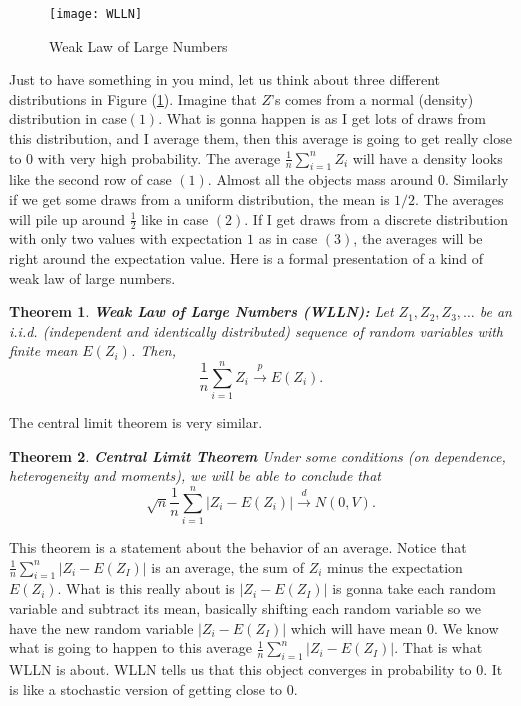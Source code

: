 \documentclass[11pt,a4paper]{amsart}
\theoremstyle{plain}
\newtheorem{theorem}{Theorem}
\theoremstyle{definition}
\begin{document}
	\begin{figure}[hbt]
	{\centering \texttt{[image: WLLN]}}
	\caption{Weak Law of Large Numbers}\label{F:WLLN}
	\end{figure}

	Just to have something in you mind, let us think about three different distributions in Figure (\ref{F:WLLN}). Imagine that $Z$'s comes from a normal (density) distribution in case$(1)$. What is gonna happen is as I get lots of draws from this distribution, and I average them, then this average is going to get really close to $0$ with very high probability. The average $\frac{1}{n} \sum_{i=1}^{n} Z_{i}$ will have a density looks like the second row of case $(1)$. Almost all the objects mass around $0$. Similarly if we get some draws from a uniform distribution, the mean is $1/2$. The averages will pile up around $\frac{1}{2}$ like in case $(2)$. If I get draws from a discrete distribution with only two values with expectation $1$ as in case $(3)$, the averages will be right around the expectation value. Here is a formal presentation of a kind of weak law of large numbers. 
	\begin{theorem}
		\textbf{Weak Law of Large Numbers (WLLN):} Let $Z_{1}, Z_{2}, Z_{3}, \ldots$ be an i.i.d. (independent and identically distributed) sequence of random variables with finite mean $E\left(Z_{i}\right)$. Then,
	\[		\frac{1}{n} \sum_{i=1}^{n} Z_{i} \stackrel{p}{\longrightarrow} E\left(Z_{i}\right).\]
	\end{theorem}
	The central limit theorem is very similar.
	\begin{theorem}
		\textbf{Central Limit Theorem} Under some conditions (on dependence, heterogeneity and moments), we will be able to conclude that
		\[	\sqrt{n} \frac{1}{n} \sum_{i=1}^{n} |Z_{i} - E(Z_{i })| \stackrel{d}{\longrightarrow} N(0,V).	\]
	\end{theorem}
	This theorem is a statement about the behavior of an average. Notice that $ \frac{1}{n} \sum_{i=1}^{n} |Z_{i} - E(Z_{I})|$ is an average, the sum of $Z_{i}$ minus the expectation $E(Z_{i})$. What is this really about is $|Z_{i} - E(Z_{I})|$ is gonna take each random variable and subtract its  mean, basically shifting each random variable so we have the new random variable $|Z_{i} - E(Z_{I})|$ which will have mean $0$. We know what is going to happen to this average $ \frac{1}{n} \sum_{i=1}^{n} |Z_{i} - E(Z_{I})|$. That is what WLLN is about. WLLN tells us that this object converges in probability to $0$. It is like a stochastic version of getting close to $0$.\par 
\end{document}
